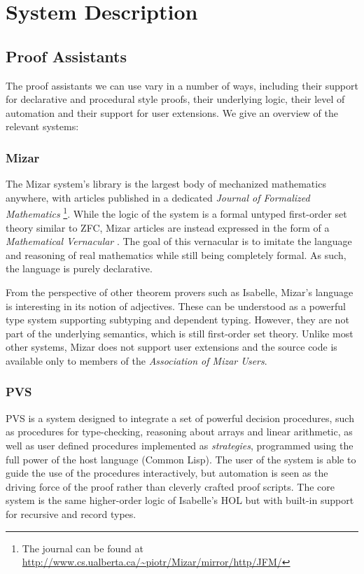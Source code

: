 \chapter{System Description}
\section{Proof Assistants}\label{ProofAssistants}
The proof assistants we can use vary in a number of ways, including their support for declarative and procedural style proofs, their underlying logic, their level of automation and their support for user extensions. We give an overview of the relevant systems:

\subsection{Mizar}\label{Mizar}
The Mizar system's library is the largest body of mechanized mathematics anywhere, with articles published in a dedicated \emph{Journal of Formalized Mathematics} \cite{MizarSoftTypes}\footnote{The journal can be found at \url{http://www.cs.ualberta.ca/~piotr/Mizar/mirror/http/JFM/}}. While the logic of the system is a formal untyped first-order set theory similar to ZFC, Mizar articles are instead expressed in the form of a \emph{Mathematical Vernacular} \cite{MizarMathematicalVernacular}. The goal of this vernacular is to imitate the language and reasoning of real mathematics while still being completely formal. As such, the language is purely declarative. 

From the perspective of other theorem provers such as Isabelle, Mizar's language is interesting in its notion of adjectives. These can be understood as a powerful type system supporting subtyping and dependent typing. However, they are not part of the underlying semantics, which is still first-order set theory. Unlike most other systems, Mizar does not support user extensions and the source code is available only to members of the \emph{Association of Mizar Users}.

\subsection{PVS}
PVS is a system designed to integrate a set of powerful decision procedures, such as procedures for type-checking, reasoning about arrays and linear arithmetic, as well as user defined procedures implemented as \emph{strategies}, programmed using the full power of the host language (Common Lisp). The user of the system is able to guide the use of the procedures interactively, but automation is seen as the driving force of the proof rather than cleverly crafted proof scripts. The core system is the same higher-order logic of Isabelle's HOL but with built-in support for recursive and record types. 

